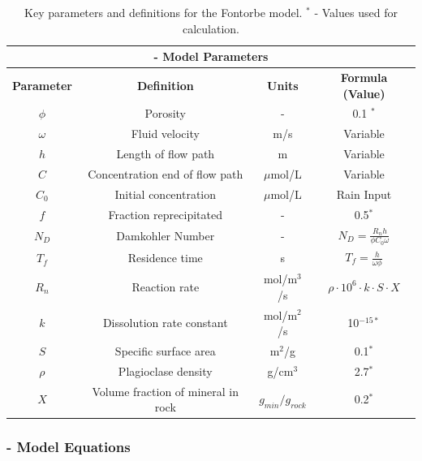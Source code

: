 \begin{table}[H]
    \centering
    \renewcommand{\arraystretch}{1.1} %
    \begin{tabular}{|c|c|c|c|}
        \hline
        \multicolumn{4}{|c|}{\textbf{\textcite{fontorbeSiliconIsotopicComposition2013} - Model Parameters}} \\  
        \hline
        \textbf{Parameter} & \textbf{Definition} & \textbf{Units} & \textbf{Formula (Value)} \\  
        \hline
        $\phi$ & Porosity & - & 0.1 $^*$\\
        $\omega$ & Fluid velocity & m/s & Variable \\
        $h$ & Length of flow path & m & Variable \\
        $C$ & Concentration \@ end of flow path & $\mu$mol/L & Variable \\
        $C_0$ & Initial concentration & $\mu$mol/L & Rain Input \\
        $f$ & Fraction reprecipitated & - & 0.5$^*$ \\
        $N_D$ & Damkohler Number & - & $N_D = \frac{R_n h}{\phi C_0 \omega}$ \\
        $T_f$ & Residence time & s & $T_f = \frac{h}{\omega\phi}$ \\
        $R_n$ & Reaction rate & mol/m$^3$/s & $\rho \cdot 10^6 \cdot k \cdot S \cdot X $ \\
        $k$ & Dissolution rate constant & mol/m$^2$/s & 10$^{-15*}$ \\
        $S$ & Specific surface area & m$^2$/g & 0.1$^*$ \\
        $\rho$ & Plagioclase density & g/cm$^3$ & 2.7$^*$ \\
        $X$ & Volume fraction of mineral in rock & $g_{min}/g_{rock}$ & 0.2$^*$ \\
        \hline
    \end{tabular}
    \caption{Key parameters and definitions for the Fontorbe model. $^*$ - Values used for calculation.}
    \label{tab:fontorbe1}
\end{table}


\FloatBarrier


\newpage



\subsubsection*{\textcite{maherRoleFluidResidence2011} - Model Equations}

